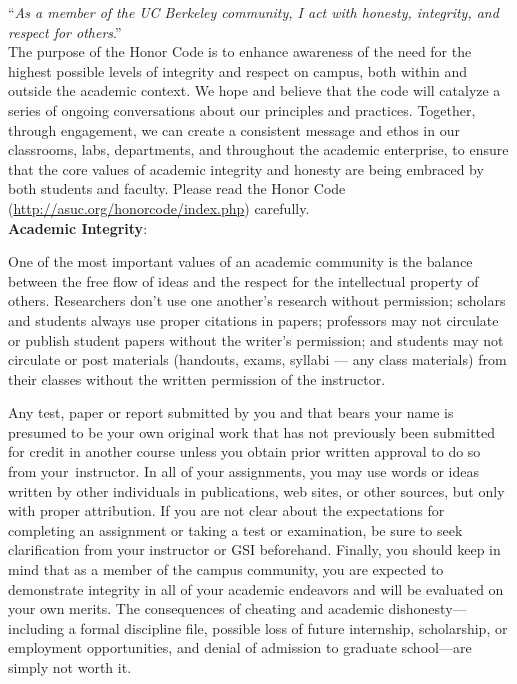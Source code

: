 \documentclass[11pt]{article}
\begin{document}
``\textit{As a member of the UC Berkeley community, I act with honesty,
integrity, and respect for others}.'' \\

The purpose of the Honor Code is to enhance awareness of the need for the
highest possible levels of integrity and respect on campus, both within and
outside the academic context. We hope and believe that the code will catalyze a
series of ongoing conversations about our principles and practices. Together,
through engagement, we can create a consistent message and ethos in our
classrooms, labs, departments, and throughout the academic enterprise, to ensure
that the core values of academic integrity and honesty are being embraced by
both students and faculty. Please read the Honor
Code (\url{http://asuc.org/honorcode/index.php}) carefully.\\

\textbf{Academic Integrity}:

One of the most important values of an academic community is the balance between
the free flow of ideas and the respect for the intellectual property of others.
Researchers don't use one another's research without permission; scholars and
students always use proper citations in papers; professors may not circulate or
publish student papers without the writer's permission; and students may not
circulate or post materials (handouts, exams, syllabi --- any class materials)
from their classes without the written permission of the instructor.

Any test, paper or report submitted by you and that bears your name is presumed
to be your own original work that has not previously been submitted for credit
in another course unless you obtain prior written approval to do so from
your instructor. In all of your assignments, you may use words or ideas written
by other individuals in publications, web sites, or other sources, but only with
proper attribution. If you are not clear about the expectations for completing
an assignment or taking a test or examination, be sure to seek clarification
from your instructor or GSI beforehand. Finally, you should keep in mind that as
a member of the campus community, you are expected to demonstrate integrity in
all of your academic endeavors and will be evaluated on your own merits. The
consequences of cheating and academic dishonesty—including a formal discipline
file, possible loss of future internship, scholarship, or employment
opportunities, and denial of admission to graduate school—are simply not worth
it. \\
\end{document}
